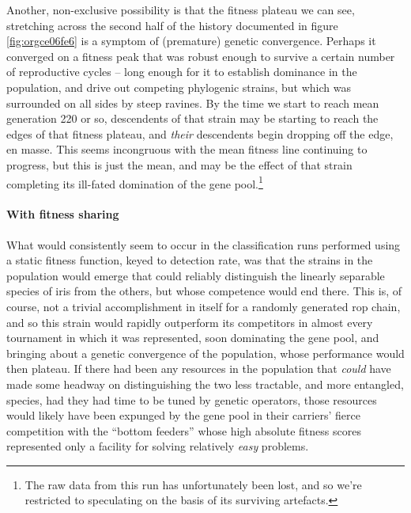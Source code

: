 \documentclass[12pt,glossary]{dalthesis}
\begin{document}
Another, non-exclusive possibility is that the fitness plateau we can see,
stretching across the second half of the history documented in figure
\ref{fig:orgce06fe6} is a symptom of (premature) genetic convergence. 
Perhaps it converged on a fitness peak that was robust enough to survive
a certain number of reproductive cycles -- long enough for it to establish
dominance in the population, and drive out competing phylogenic strains, but 
which was surrounded on all sides by steep ravines. By the time we start to reach
mean generation 220 or so, descendents of that strain may be starting to reach
the edges of that fitness plateau, and \emph{their} descendents begin dropping off the
edge, en masse. This seems incongruous with the mean fitness line continuing to
progress, but this is just the mean, and may be the effect of that strain completing
its ill-fated domination of the gene pool.\footnote{The raw data from this run has unfortunately been lost, and so we're restricted
  to speculating on the basis of its surviving artefacts.}

\paragraph{With fitness sharing}
\label{sec:org6b2c9fb}
\label{org7c38819}

 What would consistently seem to occur in the classification runs performed
 using a static fitness function, keyed to detection rate, was that the
 strains in the population would emerge that could reliably distinguish the
 linearly separable species of iris from the others, but whose competence
 would end there. This is, of course, not a trivial accomplishment in itself
 for a randomly generated \gls{rop} chain, and so this strain would rapidly
 outperform its competitors in almost every tournament in which it was
 represented, soon dominating the gene pool, and bringing about a genetic
 convergence of the population, whose performance would then plateau. If there
 had been any resources in the population that \emph{could} have made some headway
 on distinguishing the two less tractable, and more entangled, species, had
they had time to be tuned by genetic operators, those resources would likely
have been expunged by the gene pool in their carriers' fierce competition with
the ``bottom feeders'' whose high absolute fitness scores represented only a
facility for solving relatively \emph{easy} problems.
\end{document}
